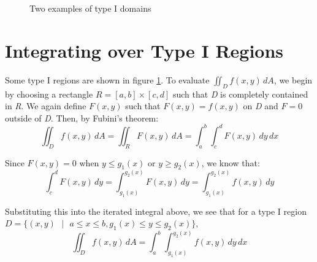 \begin{figure}[H]
    \begin{minipage}{0.5\textwidth}
    \end{minipage}
    \caption{Two examples of type I domains}
    \label{fig:type1}
\end{figure}

\section{Integrating over Type I Regions}
Some type I regions are shown in figure \ref{fig:type1}. To evaluate $\iint_{
\textit{D}} f(x,y)\,dA$, we begin by choosing a rectangle $\textit{R} = \left[ 
a, b \right] \times \left[ c, d \right]$ such that \textit{D} is completely 
contained in \textit{R}. We again define $F(x, y)$ such that $F(x, y) = f(x,y)$
on \textit{D} and $F = 0$ outside of \textit{D}. Then, by Fubini's theorem:
$$\iint_{\textit{D}} f(x, y)\,dA = \iint_{\textit{R}} F(x, y)\,dA = \int_a^b 
\int_c^d F(x, y)\,dy\,dx$$

Since $F(x, y) = 0$ when $y \leq g_1(x)$ or $y \geq g_2(x)$, we know that:
$$\int_c^d F(x, y)\,dy = \int_{g_1(x)}^{g_2(x)} F(x, y)\,dy = \int_{g_1(x)}^{
g_2(x)} f(x, y)\,dy$$

Substituting this into the iterated integral above, we see that for a type I 
region $\textit{D} = \{ (x, y) \text{ } | \text{ } a \leq x \leq b, g_1(x) 
\leq y \leq g_2(x) \}$, 
$$\iint_{\textit{D}} f(x, y)\,dA = \int_a^b \int_{g_1(x)}^{g_2(x)} f(x, y)
\,dy\,dx$$

